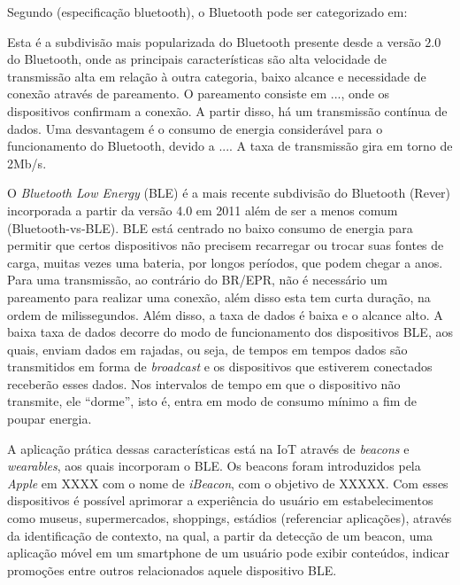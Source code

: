 \documentclass[
	article,			%
	11pt,				%
	oneside,			%
	a4paper,			%
	section=TITLE,		%
	subsection=TITLE,	%
	english,			%
	brazil,				%
	sumario=tradicional
	]{abntex2}
\begin{document}
Segundo (especificação bluetooth), o Bluetooth pode ser categorizado em:


Esta é a subdivisão mais popularizada do Bluetooth presente desde a versão $2.0$ do Bluetooth, onde 
as 
principais características são alta 
velocidade de transmissão alta em relação à outra categoria, baixo alcance e necessidade de conexão 
através de pareamento. O pareamento consiste em ..., onde os dispositivos confirmam a conexão. A 
partir disso, 
há um transmissão contínua de dados. Uma desvantagem é o consumo de energia considerável para o 
funcionamento do Bluetooth, devido a .... 
A taxa de transmissão gira em torno de 2Mb/s.
 

O \textit{Bluetooth Low Energy} (BLE) é a mais recente subdivisão do Bluetooth (Rever) incorporada 
a partir da versão 4.0 em 2011 além de ser a menos comum (Bluetooth-vs-BLE).
BLE está centrado no baixo consumo de energia para permitir que certos 
dispositivos não precisem recarregar ou trocar suas fontes de carga, muitas vezes uma bateria, por 
longos períodos, que podem chegar a anos. 
Para uma transmissão, ao contrário do BR/EPR, não é necessário um pareamento para realizar uma 
conexão, além disso esta tem curta duração, na ordem de milissegundos.
Além disso, a taxa de dados é baixa e o alcance alto. A baixa taxa de dados decorre do modo de 
funcionamento dos dispositivos BLE, aos quais, enviam dados em rajadas, ou seja, de tempos em 
tempos dados são transmitidos em forma de \textit{broadcast} e os dispositivos que estiverem 
conectados receberão esses dados. Nos intervalos de tempo em que o dispositivo não transmite, ele 
``dorme'', isto é, entra em modo de consumo mínimo a fim de poupar energia.

A aplicação prática dessas características está na IoT através de \textit{beacons} e  
\textit{wearables}, aos quais incorporam o BLE. Os beacons foram introduzidos pela \textit{Apple} 
em XXXX com o nome de \textit{iBeacon}, com o objetivo de XXXXX. Com esses dispositivos é possível 
aprimorar a experiência do usuário em estabelecimentos como museus, supermercados, shoppings, 
estádios (referenciar aplicações), através da identificação de contexto, na qual, a partir da 
detecção de um beacon, uma aplicação móvel em um smartphone de um usuário pode exibir conteúdos, 
indicar promoções entre outros relacionados aquele dispositivo BLE.
\end{document}
